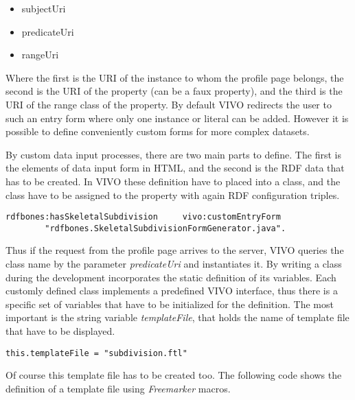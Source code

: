 \begin{itemize}
	\item{subjectUri}
	\item{predicateUri}
	\item{rangeUri}
\end{itemize}

Where the first is the URI of the instance to whom the profile page belongs, the second is the URI of the property (can be a faux property), and the third is the URI of the range class of the property. By default VIVO redirects the user to such an entry form where only one instance or literal can be added. However it is possible to define conveniently custom forms for more complex datasets.

By custom data input processes, there are two main parts to define. The first is the elements of data input form in HTML, and the second is the RDF data that has to be created. In VIVO these definition have to placed into a class, and the class have to be assigned to the property with again RDF configuration triples. 

\begin{lstlisting}[captionpos=b, caption= Entry form generator class definition, label=skullJSON, belowskip=1em, aboveskip=2em,
basicstyle=\footnotesize,frame=single]
rdfbones:hasSkeletalSubdivision		vivo:customEntryForm	
		"rdfbones.SkeletalSubdivisionFormGenerator.java".
\end{lstlisting}

Thus if the request from the profile page arrives to the server, VIVO queries the class name by the parameter \textit{predicateUri} and instantiates it. By writing a class during the development incorporates the static definition of its variables. Each customly defined class implements a predefined VIVO interface, thus there is a specific set of variables that have to be initialized for the definition. The most important is the string variable \textit{templateFile}, that holds the name of template file that have to be displayed.


\begin{lstlisting}[captionpos=b, caption= Form defintion in Java, label=skullJSON, belowskip=1em, aboveskip=2em,
basicstyle=\footnotesize,frame=single]
	this.templateFile = "subdivision.ftl"
\end{lstlisting}

Of course this template file has to be created too. The following code shows the definition of a template file using \textit{Freemarker} macros.

